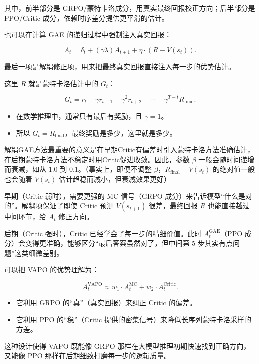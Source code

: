 其中，前半部分是 GRPO/蒙特卡洛成分，用真实最终回报校正方向；后半部分是 PPO/Critic 成分，依赖时序差分提供更平滑的估计。

也可以在计算 GAE 的递归过程中强制注入真实回报：

\[
A_t
=
\delta_t
+
(\gamma\lambda)A_{t+1}
+
\eta\cdot(R-V(s_t)).
\]

最后一项是解耦修正项，用来把最终真实回报直接注入每一步的优势估计。

这里 \(R\) 就是蒙特卡洛估计中的 \(G_t\)：

\[
G_t
=
r_t+\gamma r_{t+1}+\gamma^2 r_{t+2}
+\cdots+
\gamma^{T-t}R_{\mathrm{final}}.
\]

\begin{itemize}
\tightlist
\item
  在数学推理中，通常只有最后有奖励，且 \(\gamma=1\)。
\item
  所以 \(G_t=R_{\mathrm{final}}\)，最终奖励是多少，这里就是多少。
\end{itemize}

解耦GAE方法最重要的意义是在早期Critic有偏差时引入蒙特卡洛方法准确估计，在后期蒙特卡洛方法不稳定时用Critic促进收敛。因此，参数 \(\beta\) 一般会随时间递增而衰减，如从 \(1.0\) 到 \(0.1\)。（事实上，即便不调整 \(\beta\)，\(R_{\mathrm{final}}-V(s_t)\) 的绝对值一般也会随着 \(V(s_t)\) 估计趋稳而减小，但衰减效果更好）

早期（Critic 弱时），需要更强的 MC 信号（GRPO 成分）来告诉模型``什么是对的''。解耦项保证了即使 Critic 预测 \(V(s_{t+1})\) 很差，最终回报 \(R\) 也能直接越过中间环节，给 \(A_t\) 修正方向。

后期（Critic 强时），Critic 已经学会了每一步的精细价值。此时 \(A_t^{\mathrm{GAE}}\)（PPO 成分）会变得更准确，能够区分``最后答案虽然对了，但中间第 5 步其实有点问题''这类细微差别。

可以把 VAPO 的优势理解为：

\[
A_t^{\mathrm{VAPO}}
\approx
w_1\cdot A_t^{\mathrm{MC}}
+
w_2\cdot A_t^{\mathrm{Critic}}.
\]

\begin{itemize}
\tightlist
\item
  它利用 GRPO 的``真''（真实回报）来纠正 Critic 的偏差。
\item
  它利用 PPO 的``稳''（Critic 提供的密集信号）来降低长序列蒙特卡洛采样的方差。
\end{itemize}

这种设计使得 VAPO 既能像 GRPO 那样在大模型推理初期快速找到正确方向，又能像 PPO 那样在后期细致打磨每一步的逻辑质量。

